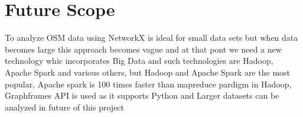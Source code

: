
\section{Future Scope}
To analyze OSM data using NetworkX is ideal for small data sets but when data becomes large this approach becomes vague and at that pont we need a new technology whic incorporates Big Data and such technologies are Hadoop, Apache Spark and various others, but Hadoop and Apache Spark are the most popular, Apache spark is 100 times faster than mapreduce pardigm in Hadoop, Graphframes API is used as it supports Python and Larger datasets can be analyzed in future of this project


